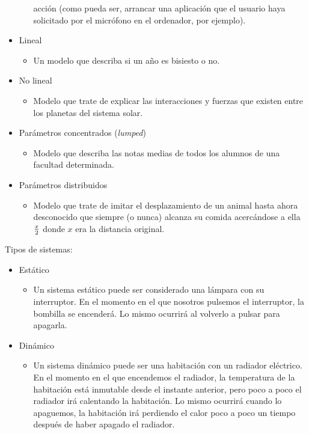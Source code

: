 \documentclass[12pt]{article}
\begin{document}
\begin{itemize}
\begin{itemize}
                  acción (como pueda ser, arrancar una aplicación que el usuario haya solicitado por el
                  micrófono en el ordenador, por ejemplo).
        \end{itemize}
    \item Lineal
        \begin{itemize}
            \item Un modelo que describa si un año es bisiesto o no.
        \end{itemize}
    \item No lineal
        \begin{itemize}
            \item Modelo que trate de explicar las interacciones y fuerzas que existen entre los
                  planetas del sistema solar.
        \end{itemize}
    \item Parámetros concentrados (\emph{lumped})
        \begin{itemize}
            \item Modelo que describa las notas medias de todos los alumnos de una facultad determinada.
        \end{itemize}
    \item Parámetros distribuidos
        \begin{itemize}
            \item Modelo que trate de imitar el desplazamiento de un animal hasta ahora desconocido
                  que siempre (o nunca) alcanza su comida acercándose a ella $x \over 2$ donde $x$ era
                  la distancia original.
        \end{itemize}
\end{itemize}
Tipos de sistemas:
\begin{itemize}
    \item Estático
        \begin{itemize}
            \item Un sistema estático puede ser considerado una lámpara con su interruptor. En el
            momento en el que nosotros pulsemos el interruptor, la bombilla se encenderá. Lo mismo
            ocurrirá al volverlo a pulsar para apagarla.
        \end{itemize}
    \item Dinámico
        \begin{itemize}
            \item Un sistema dinámico puede ser una habitación con un radiador eléctrico. En el momento
            en el que encendemos el radiador, la temperatura de la habitación está inmutable desde
            el instante anterior, pero poco a poco el radiador irá calentando la habitación. Lo mismo
            ocurrirá cuando lo apaguemos, la habitación irá perdiendo el calor poco a poco un tiempo
            después de haber apagado el radiador.
        \end{itemize}
\end{itemize}
\newpage
\end{document}
